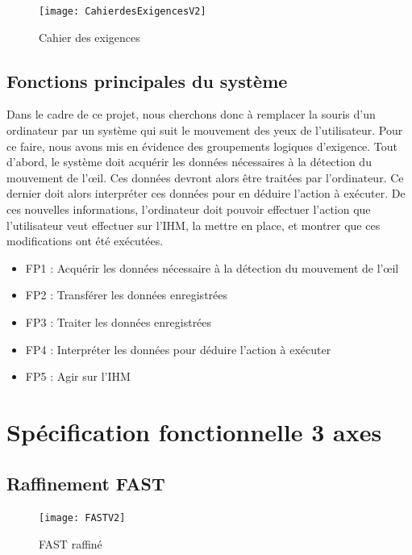 \begin{figure}[H]
  \centering
  \texttt{[image: CahierdesExigencesV2]}
  \caption{Cahier des exigences}
  \label{fig:exigences}
\end{figure}

\section{Fonctions principales du système}

Dans le cadre de ce projet, nous cherchons donc à remplacer la souris d'un ordinateur par un système qui suit le mouvement des yeux de l'utilisateur. Pour ce faire, nous avons mis en évidence des groupements logiques d'exigence. Tout d'abord, le système doit acquérir les données nécessaires à la détection du mouvement de l'œil. Ces données devront alors être traitées par l'ordinateur. Ce dernier doit alors interpréter ces données pour en déduire l'action à exécuter. De ces nouvelles informations, l'ordinateur doit pouvoir effectuer l'action que l'utilisateur veut effectuer sur l'IHM, la mettre en place, et montrer que ces modifications ont été exécutées. 

\begin{itemize}[label=\textbullet,font=\color{black}]
\item FP1 : Acquérir les données nécessaire à la détection du mouvement de l'œil 
\item\colorbox{sable}{FP2 : Transférer les données enregistrées}
\item FP3 : Traiter les données enregistrées 
\item FP4 : Interpréter les données pour déduire l'action à exécuter 
\item FP5 : Agir sur l'IHM 
\end{itemize}

\chapter{Spécification fonctionnelle  3 axes}

\section{Raffinement FAST}

\begin{figure}[h]
  \centering
  \texttt{[image: FASTV2]}
  \caption{FAST raffiné}
  \label{fig:FAST}
\end{figure}

